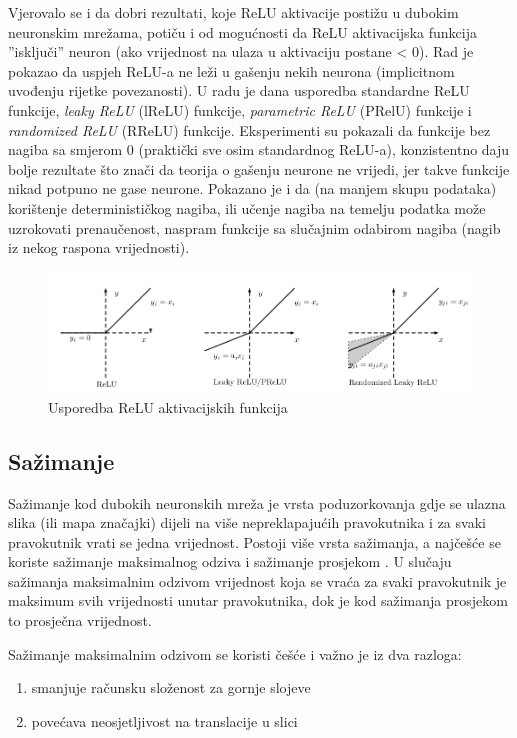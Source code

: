 \documentclass[times, utf8, diplomski, numeric]{fer}
\begin{document}
Vjerovalo se i da dobri rezultati, koje ReLU aktivacije postižu u dubokim neuronskim mrežama, potiču i od mogućnosti da ReLU aktivacijska funkcija ''isključi'' neuron (ako vrijednost na ulaza u aktivaciju postane < 0). Rad \cite{xu2015empirical} je pokazao da uspjeh ReLU-a ne leži u gašenju nekih neurona (implicitnom uvođenju rijetke povezanosti). U radu je dana usporedba standardne ReLU funkcije, \emph{leaky ReLU} (lReLU) funkcije, \emph{parametric ReLU} (PRelU) funkcije i \emph{randomized ReLU} (RReLU) funkcije. Eksperimenti su pokazali da funkcije bez nagiba sa smjerom 0 (praktički sve osim standardnog ReLU-a), konzistentno daju bolje rezultate što znači da teorija o gašenju neurone ne vrijedi, jer takve funkcije nikad potpuno ne gase neurone. Pokazano je i da (na manjem skupu podataka) korištenje determinističkog nagiba, ili učenje nagiba na temelju podatka može uzrokovati prenaučenost, naspram funkcije sa slučajnim odabirom nagiba (nagib iz nekog raspona vrijednosti).

\begin{figure}[htb]
\centering
\includegraphics[width=\textwidth]{imgs/relus.png}
\caption{Usporedba ReLU aktivacijskih funkcija}
\label{fig:relu_plot}
\end{figure}

\subsection{Sažimanje}

Sažimanje kod dubokih neuronskih mreža je vrsta poduzorkovanja gdje se ulazna slika (ili mapa značajki) dijeli na više nepreklapajućih pravokutnika i za svaki pravokutnik vrati se jedna vrijednost. Postoji više vrsta sažimanja, a najčešće se koriste sažimanje maksimalnog odziva  i sažimanje prosjekom .
U slučaju sažimanja maksimalnim odzivom vrijednost koja se vraća za svaki pravokutnik je maksimum svih vrijednosti unutar pravokutnika, dok je kod sažimanja prosjekom to prosječna vrijednost.

Sažimanje maksimalnim odzivom se koristi češće i važno je iz dva razloga:
\begin{enumerate}
    \item smanjuje računsku složenost za gornje slojeve
    \item povećava neosjetljivost na translacije u slici
\end{enumerate}
\end{document}
